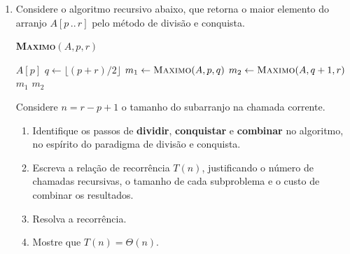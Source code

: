 \documentclass[9pt,a4paper]{extarticle}
\begin{document}
\begin{enumerate}
\begin{enumerate}[label=(\alph*)]
    \textit{Sugestão: para cada valor de $i$, conte quantos valores de $j$ são considerados e some sobre $i$. Use a identidade $\sum_{i=1}^{n-1} (n - i) = \dfrac{n(n-1)}{2}$.}

    \item Construa a tabela de custos no estilo CLRS para o pior caso e escreva $T_{\text{pior}}(n)$ como soma dos termos $c_i$ ponderados por suas frequências.
    \item Mostre que $T_{\text{pior}}(n) = \Theta(n^2)$, exibindo as constantes da definição assintótica.
    \item Descreva o \textbf{melhor caso} do algoritmo: quantas execuções da linha 3 ocorrem? Qual é a classe assintótica de $T_{\text{melhor}}(n)$?
\end{enumerate}

  \item Considere o algoritmo recursivo abaixo, que retorna o maior elemento do arranjo $A[p\,..\,r]$ pelo método de divisão e conquista.

    \begin{center}
    \begin{minipage}{0.7\textwidth}
    \textbf{\textsc{Maximo}}$(A, p, r)$
    \begin{algorithmic}[1]
            \State \Return $A[p]$
        \EndIf
        \State $q \gets \lfloor (p + r) / 2 \rfloor$
        \State $m_1 \gets \textsc{Maximo}(A, p, q)$
        \State $m_2 \gets \textsc{Maximo}(A, q + 1, r)$
            \State \Return $m_1$
        \Else
            \State \Return $m_2$
        \EndIf
    \end{algorithmic}
    \end{minipage}
    \end{center}

    Considere $n = r - p + 1$ o tamanho do subarranjo na chamada corrente.

    \begin{enumerate}[label=(\alph*)]
        \item Identifique os passos de \textbf{dividir}, \textbf{conquistar} e \textbf{combinar} no algoritmo, no espírito do paradigma de divisão e conquista.
        \item Escreva a relação de recorrência $T(n)$, justificando o número de chamadas recursivas, o tamanho de cada subproblema e o custo de combinar os resultados.
        \item Resolva a recorrência.
        \item Mostre que $T(n) = \Theta(n)$.
    \end{enumerate}
\end{enumerate}
\end{document}
